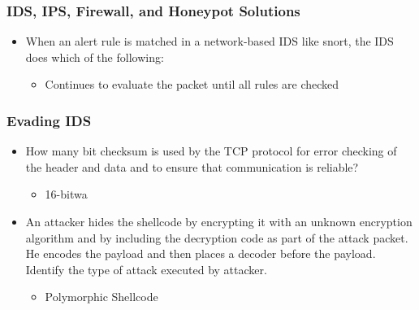 \subsubsection{IDS, IPS, Firewall, and Honeypot Solutions}
\begin{itemize}
    \item When an alert rule is matched in a network-based IDS like snort, the IDS does which of the following:
    \begin{itemize}
        \item   Continues to evaluate the packet until all rules are checked
    \end{itemize}
\end{itemize}
\subsubsection{Evading IDS}
\begin{itemize}
    \item How many bit checksum is used by the TCP protocol for error checking of the header and data and to ensure that communication is reliable?
    \begin{itemize}
        \item  16-bitwa
    \end{itemize}
    \item An attacker hides the shellcode by encrypting it with an unknown encryption algorithm and by including the decryption code as part of the attack packet. He encodes the payload and then places a decoder before the payload. Identify the type of attack executed by attacker.
    \begin{itemize}
        \item Polymorphic Shellcode
    \end{itemize}
\end{itemize}
